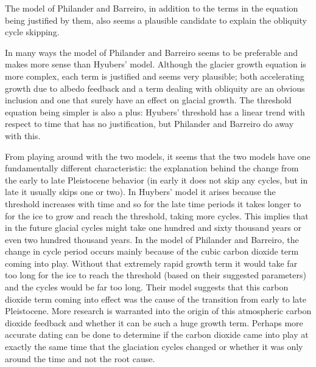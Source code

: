 \documentclass[11pt]{article}
\begin{document}
The model of Philander and Barreiro, in addition to the terms in the equation being justified by them, also seems a plausible candidate to explain the obliquity cycle skipping. 

In many ways the model of Philander and Barreiro seems to be preferable and makes more sense than Hyubers' model. Although the glacier growth equation is more complex, each term is justified and seems very plausible; both accelerating growth due to albedo feedback and a term dealing with obliquity are an obvious inclusion and one that surely have an effect on glacial growth.
The threshold equation being simpler is also a plus: Hyubers' threshold has a linear trend with respect to time that has no justification, but Philander and Barreiro do away with this.

From playing around with the two models, it seems that the two models have one fundamentally different characteristic: the explanation behind the change from the early to late Pleistocene behavior (in early it does not skip any cycles, but in late it usually skips one or two).
In Huybers' model it arises because the threshold increases with time and so for the late time periods it takes longer to for the ice to grow and reach the threshold, taking more cycles.
This implies that in the future glacial cycles might take one hundred and sixty thousand years or even two hundred thousand years.
In the model of Philander and Barreiro, the change in cycle period occurs mainly because of the cubic carbon dioxide term coming into play.
Without that extremely rapid growth term it would take far too long for the ice to reach the threshold (based on their suggested parameters) and the cycles would be far too long.
Their model suggests that this carbon dioxide term coming into effect was the cause of the transition from early to late Pleistocene.
More research is warranted into the origin of this atmospheric carbon dioxide feedback and whether it can be such a huge growth term.
Perhaps more accurate dating can be done to determine if the carbon dioxide came into play at exactly the same time that the glaciation cycles changed or whether it was only around the time and not the root cause.
\end{document}
